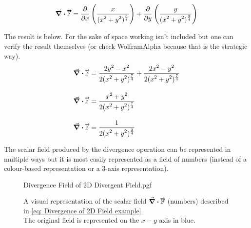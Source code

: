\documentclass[main.tex]{subfiles}
\begin{document}
                    \begin{equation}
                        \div{\vect{\mathbb{F}}} = \frac{\partial}{\partial x}\left(\bfrac{x}{(x^2 + y^2)^\frac{3}{4}}\right) + \frac{\partial}{\partial y}\left(\bfrac{y}{(x^2 + y^2)^\frac{3}{4}}\right)
                        \label{eq: Divergence of 2D Field}
                    \end{equation}

                    The result is below. For the sake of space working isn't included but one can verify the result themselves (or check WolframAlpha because that is the strategic way).
                    \begin{align}
                        \div{\vect{\mathbb{F}}} &= \bfrac{2y^2 - x^2}{2(x^2 + y^2)^\frac{7}{4}} + \bfrac{2x^2 - y^2}{2(x^2 + y^2)^\frac{7}{4}} \nonumber\\[1em]
                        \div{\vect{\mathbb{F}}} &= \bfrac{x^2 + y^2}{2(x^2 + y^2)^\frac{7}{4}} \nonumber\\[1em]
                        \div{\vect{\mathbb{F}}} &= \bfrac{1}{2(x^2 + y^2)^\frac{3}{4}} \label{eq: Divergence of 2D Field example}
                    \end{align}
                    

                    \vspace{2em}
                    The scalar field produced by the divergence operation can be represented in multiple ways but it is most easily represented as a field of numbers (instead of a colour-based representation or a 3-axis representation).

                    \begin{figure}[h]
                        \centering
                        \scalebox{0.9}
                        {
                            \begin{adjustbox}{clip,trim=10mm 10mm 10mm 9mm}
                                {{Divergence Field of 2D Divergent Field.pgf}}
                            \end{adjustbox}
                        }
                        \captionsetup{singlelinecheck=off}
                        \caption[.]{A visual representation of the scalar field $\protect \div{\vect{\mathbb{F}}}$ (numbers) described in \eqref{eq: Divergence of 2D Field example}\\The original field is represented on the $x-y$ axis in blue.}
                        \label{fig: Divergence Field of 2D Divergent Field}
                    \end{figure}
                    \FloatBarrier
                    \vspace{2em}
\end{document}
